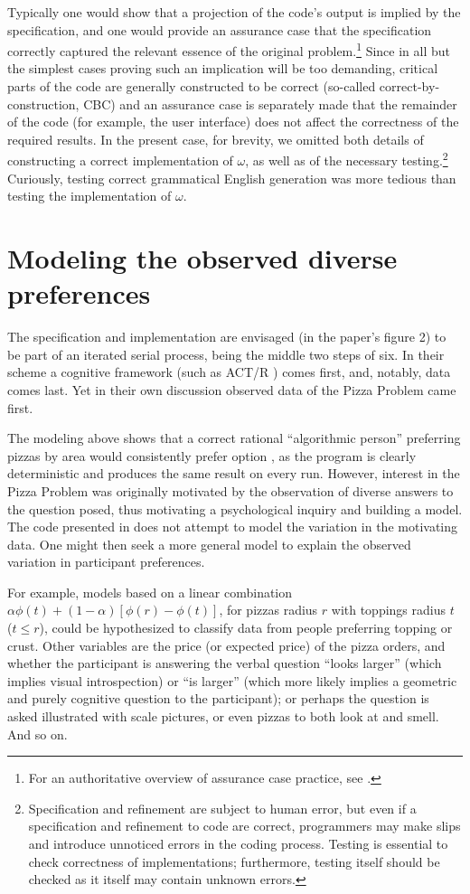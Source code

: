 \documentclass[11pt]{article}
\begin{document}
Typically one would show that a projection of the code's output is implied by the specification, and one would provide an assurance case that the specification correctly captured the relevant essence of the original problem.\footnote{For an authoritative overview of assurance case practice, see \cite{assurance}.} Since in all but the simplest cases proving such an implication will be too demanding, critical parts of the code are generally constructed to be correct (so-called correct-by-construction, CBC) and an assurance case is separately made that the remainder of the code (for example, the user interface) does not affect the correctness of the required results. In the present case, for brevity, we omitted both details of constructing a correct implementation of $\omega$, as well as of the necessary testing.\footnote{Specification and refinement are subject to human error, but even if a specification and refinement to code are correct, programmers may make slips and introduce unnoticed errors in the coding process. Testing is essential to check correctness of implementations; furthermore, testing itself should be checked as it itself may contain unknown errors.} Curiously, testing correct grammatical English generation was more tedious than testing the implementation of $\omega$.

\section{Modeling the observed diverse preferences}
The specification and implementation are envisaged (in the paper's figure 2) to be part of an iterated serial process, being the middle two steps of six. In their scheme a cognitive framework (such as ACT/R \cite{actr}) comes first, and, notably, data comes last. Yet in their own discussion observed data of the Pizza Problem came first.

The modeling above shows that a correct rational ``algorithmic person'' preferring pizzas by area would consistently prefer option \orderB, as the program is clearly deterministic and produces the same result on every run. However, interest in the Pizza Problem was originally motivated by the observation of diverse answers to the question posed, thus motivating a psychological inquiry and building a model. The  code presented in \cite{pizzap} does not attempt to model the variation in the motivating data. One might then seek a more general model to explain the observed variation in participant preferences. 

For example, models based on a linear combination $\alpha \phi(t)+ (1-\alpha)[\phi(r)-\phi(t)]$, for pizzas radius $r$ with toppings radius $t$ ($t\leq r$), could be hypothesized to classify data from people preferring topping or crust. Other variables are the price (or expected price) of the pizza orders, and whether the participant is answering the verbal question ``looks larger'' (which implies visual introspection) or ``is larger'' (which more likely implies a geometric and purely cognitive question to the participant); or perhaps the question is asked illustrated with scale pictures, or even pizzas to both look at and smell. And so on.
\end{document}
